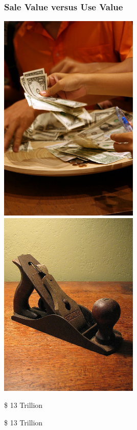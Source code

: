 \documentclass[18pt]{beamer}
\begin{document}
\begin{frame}[plain]
\frametitle{Sale Value versus Use Value}
  \includegraphics[width=0.5\textwidth,height=\paperheight]{../Art/2672465894_5b21e12135_z.jpg}
  \includegraphics[width=0.5\textwidth,height=\paperheight]{../Art/4293485922_7474ef04ce_z.jpg}
\end{frame}

{
\begin{frame}[plain]
\fontsize{72pt}{90pt}\selectfont
\center
\begin{center}
\$ 13 Trillion
\end{center}
\end{frame}
}

{
\begin{frame}[plain]
\fontsize{72pt}{90pt}\selectfont
\center
\begin{center}
\$ 13 Trillion
\end{center}
\end{frame}
}
\end{document}
